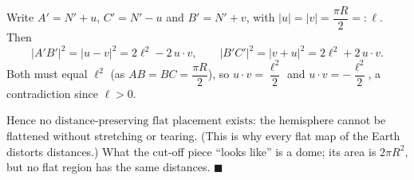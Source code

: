 Write $A'=N'+u$, $C'=N'-u$ and $B'=N'+v$, with $|u|=|v|=\dfrac{\pi R}{2}=:\ell$. Then
\[
|A'B'|^2=|u-v|^2=2\ell^2-2\,u\cdot v,\qquad |B'C'|^2=|v+u|^2=2\ell^2+2\,u\cdot v .
\]
Both must equal $\ell^2$ (as $AB=BC=\dfrac{\pi R}{2}$), so $u\cdot v=\dfrac{\ell^2}{2}$ and $u\cdot v=-\dfrac{\ell^2}{2}$, a contradiction since $\ell>0$.

Hence $\boxed{\text{no distance-preserving flat placement exists}}$: the hemisphere cannot be flattened without stretching or tearing. (This is why every flat map of the Earth distorts distances.) What the cut-off piece ``looks like'' is a dome; its area is $2\pi R^2$, but no flat region has the same distances. $\blacksquare$
